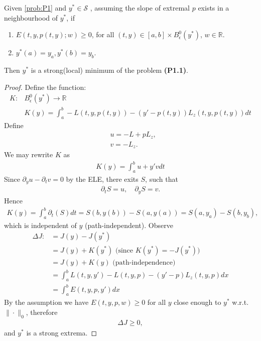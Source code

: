 \begin{theorem}
	Given \eqref{prob:P1} and $y^* \in \mathcal{S} $ , assuming the slope of extremal $p$ exists in a neighbourhood of $y^*$, if 
	\begin{enumerate}
		\item $E(t, y, p(t, y); w ) \ge 0$,  for all $(t, y) \in [a, b] \times B^0_\epsilon (y^*)$,  $w \in \mathbb{R}$. 
		\item $y^*(a) = y_a, y^*(b) = y_b$. 
	\end{enumerate} 
	Then $y^*$ is a strong(local) minimum of the problem \textbf{(P1.1)}.
\end{theorem}
\begin{proof}
	Define the function: 
	\begin{align*}
		K: &B_\epsilon^0(y^*) \rightarrow \mathbb{R}\\
		   &K(y) = \int_a^b - L(t, y, p(t, y)) - (y' - p(t, y))L_z(t, y, p(t, y)) dt 
	\end{align*}
	Define
	\begin{align*}
		& u = -L + pL_z,\\
		& v = -L_z.
	\end{align*}
	We may rewrite $K$ as 
	\begin{align*}
		K(y) = \int_a^b u + y' v dt
	\end{align*}
	Since $\partial_y u - \partial_t v = 0$ by the ELE, there exits $S$, such that
	\begin{align*}
		\partial_t S = u,\quad \partial_y S = v.
	\end{align*}
	Hence
	\begin{align*}
		K(y) = \int_a^b \partial_t(S) dt = S(b, y(b)) - S(a, y(a)) = S(a, y_a) - S(b, y_b),
	\end{align*}
	which is independent of $y$ (path-independent). Observe
	\begin{align*}
		\Delta J: &= J(y) - J(y^*) \\
		& = J(y) + K(y^*)\text{ (since $K(y^*) = -J(y^*)$)}\\
		& = J(y) + K(y) \text{ (path-independence)}\\
		& = \int_a^b L(t, y, y') -L(t, y, p) - (y' - p)L_z(t, y, p)dx \\
		& = \int_a^b E(t, y, p, y') dx
	\end{align*}
	By the assumption we have $E(t, y, p, w) \ge 0$ for all $y$ close enough to $y^*$  w.r.t. $\|\cdot\|_0$, therefore
	\begin{align*}
		\Delta J \ge 0,
	\end{align*}
	and $y^*$ is a strong extrema.
\end{proof}


